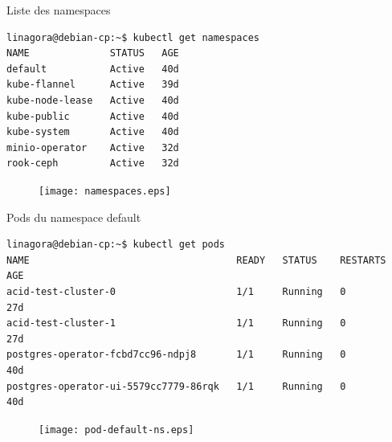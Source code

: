 \begin{frame}[fragile]{Liste des namespaces}

\begin{tiny}
\begin{Verbatim}[commandchars=\\\{\}]
linagora@debian-cp:~$ kubectl get namespaces
NAME              STATUS   AGE
default           Active   40d
kube-flannel      Active   39d
kube-node-lease   Active   40d
kube-public       Active   40d
kube-system       Active   40d
minio-operator    Active   32d
rook-ceph         Active   32d
\end{Verbatim}
\end{tiny}

\begin{figure}
\begin{center}
\texttt{[image: namespaces.eps]}
\end{center}
\end{figure}

\end{frame}


\begin{frame}[fragile]{Pods du namespace default}

\begin{tiny}
\begin{Verbatim}[commandchars=\\\{\}]
linagora@debian-cp:~$ kubectl get pods          
NAME                                    READY   STATUS    RESTARTS   AGE
acid-test-cluster-0                     1/1     Running   0          27d
acid-test-cluster-1                     1/1     Running   0          27d
postgres-operator-fcbd7cc96-ndpj8       1/1     Running   0          40d
postgres-operator-ui-5579cc7779-86rqk   1/1     Running   0          40d
\end{Verbatim}
\end{tiny}

\begin{figure}
\begin{center}
\texttt{[image: pod-default-ns.eps]}
\end{center}
\end{figure}

\end{frame}


